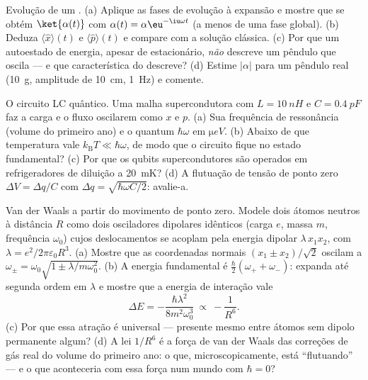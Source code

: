 \begin{exercise}[$\star\star$]\label{exo:b3:harmonic-oscillator:8}
Evolução de um . (a) Aplique as fases de evolução à
expansão e mostre que se obtém $\ket{\alpha(t)}$ com $\alpha(t) =
\alpha\eu^{-\iu\omega t}$ (a menos de uma fase global). (b) Deduza
$\langle\hat x\rangle(t)$ e $\langle\hat p\rangle(t)$ e compare com a
solução clássica. (c) Por que um autoestado de energia, apesar de
estacionário, \emph{não} descreve um pêndulo que oscila --- e que
característica do  descreve? (d) Estime $|\alpha|$ para
um pêndulo real (\qty{10}{g}, amplitude de \qty{10}{cm},
\qty{1}{Hz}) e comente.
\end{exercise}

\begin{exercise}[$\star\star$]\label{exo:b3:harmonic-oscillator:9}
O circuito LC quântico. Uma malha supercondutora com $L =
\qty{10}{nH}$ e $C = \qty{0.4}{pF}$ faz a carga e o fluxo oscilarem
como $x$ e $p$. (a) Sua frequência de ressonância (volume do primeiro
ano) e o quantum $\hbar\omega$ em $\unit{\micro eV}$. (b) Abaixo de que
temperatura vale $k_{\text{B}}T \ll \hbar\omega$, de modo que o
circuito fique no estado fundamental? (c) Por que os qubits
supercondutores são operados em refrigeradores de diluição a
\qty{20}{mK}? (d) A flutuação de tensão de ponto zero
$\Delta V = \Delta q/C$ com $\Delta q =
\sqrt{\hbar\omega C/2}$: avalie-a.
\end{exercise}

\begin{exercise}[$\star\star\star$]\label{exo:b3:harmonic-oscillator:10}
Van der Waals a partir do movimento de ponto zero. Modele dois átomos
neutros à distância $R$ como dois osciladores dipolares idênticos
(carga $e$, massa $m$, frequência $\omega_0$) cujos deslocamentos se
acoplam pela energia dipolar $\lambda\,x_1x_2$, com
$\lambda = e^2/2\pi\varepsilon_0R^3$. (a) Mostre que as coordenadas
normais $(x_1 \pm x_2)/\sqrt2$ oscilam a
$\omega_\pm = \omega_0\sqrt{1 \pm \lambda/m\omega_0^2}$. (b) A energia
fundamental é $\tfrac\hbar2(\omega_+ + \omega_-)$: expanda até segunda
ordem em $\lambda$ e mostre que a energia de interação vale
\[
\Delta E = -\frac{\hbar\lambda^2}{8m^2\omega_0^3}
\ \propto\ -\frac{1}{R^6} .
\]
(c) Por que essa atração é universal --- presente mesmo entre átomos
sem dipolo permanente algum? (d) A lei $1/R^6$ é a força de van der
Waals das correções de gás real do volume do primeiro ano: o que,
microscopicamente, está ``flutuando'' --- e o que aconteceria com essa
força num mundo com $\hbar = 0$?
\end{exercise}

